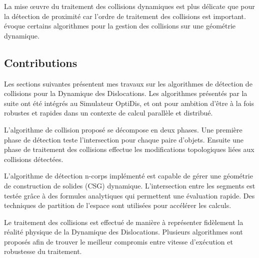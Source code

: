 \documentclass[11pt,class=article,float=false,crop=false]{standalone}
\begin{document}
La mise œuvre du traitement des collisions dynamiques est plus délicate que pour la détection de proximité car l'ordre de traitement des collisions est important.   évoque certains algorithmes pour la gestion des collisions sur une géométrie dynamique.

 

\subsection{Contributions}

Les sections suivantes présentent mes travaux sur les algorithmes de détection de collisions pour la Dynamique des Dislocations. Les algorithmes présentés par la suite ont été intégrés au Simulateur OptiDis, et ont pour ambition d'être à la fois robustes et rapides dans un contexte de calcul parallèle et distribué.

L'algorithme de collision proposé se décompose en deux phases. Une première phase de détection teste l'intersection pour chaque paire d'objets. Ensuite une phase de traitement des collisions effectue les modifications topologiques liées aux collisions détectées.

L'algorithme de détection n-corps implémenté est capable de gérer une géométrie de construction de solides (CSG) dynamique. L'intersection entre les segments est testée grâce à des formules analytiques qui permettent une évaluation rapide. Des techniques de partition de l'espace sont utilisées pour accélérer les calculs.

Le traitement des collisions est effectué de manière à représenter fidèlement la réalité physique de la Dynamique des Dislocations. Plusieurs algorithmes sont proposés afin de trouver le meilleur compromis entre vitesse d'exécution et robustesse du traitement.
\end{document}
